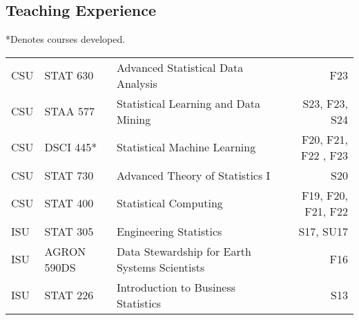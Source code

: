 \documentclass[margin,line]{res}
\begin{document}
\begin{resume}
\section{\sc Teaching Experience}
*Denotes courses developed.\\

\vspace{-.4cm}

\begin{table}[H]
\begin{tabular}{l l l r}
CSU & STAT 630 & Advanced Statistical Data Analysis & F23 \\
CSU & STAA 577 & Statistical Learning and Data Mining  & S23, F23, S24 \\
CSU & DSCI 445* & Statistical Machine Learning & F20, F21, F22 , F23 \\
CSU & STAT 730 & Advanced Theory of Statistics I & S20 \\
CSU & STAT 400 & Statistical Computing & F19, F20, F21, F22 \\
ISU & STAT 305 & Engineering Statistics & S17, SU17 \\
ISU & AGRON 590DS & Data Stewardship for Earth Systems Scientists & F16 \\
ISU & STAT 226 & Introduction to Business Statistics & S13 \\
\end{tabular}
\end{table}

% 
% 
% 
% 


\end{resume}
\end{document}
